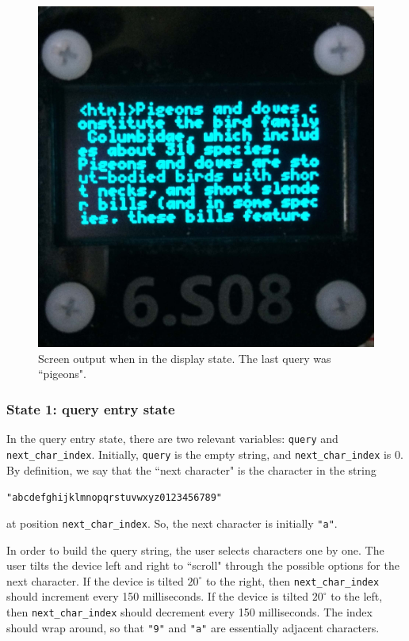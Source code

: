 \documentclass[12pt]{article}
\begin{document}
\begin{figure}[t]
\centering
\includegraphics[scale=0.125]{pigeons.png}
\vspace{5mm}
\caption{Screen output when in the display state. The last query was ``pigeons".}
\label{fig:pigeons}
\end{figure}

\subsubsection{State 1: query entry state}
In the query entry state, there are two relevant variables: \texttt{query} and \texttt{next_char_index}.  Initially, \texttt{query} is the empty string, and \texttt{next_char_index} is 0.  By definition, we say that the ``next character" is the character in the string

\begin{centering}
\texttt{"abcdefghijklmnopqrstuvwxyz0123456789"}\\
\end{centering}
\noindent at position \texttt{next_char_index}.  So, the next character is initially \texttt{"a"}.

In order to build the query string, the user selects characters one by one.  The user tilts the device left and right to ``scroll" through the possible options for the next character.  If the device is tilted $20^{\circ}$ to the right, then \texttt{next_char_index} should increment every 150 milliseconds.  If the device is tilted $20^{\circ}$ to the left, then \texttt{next_char_index} should decrement every 150 milliseconds.  The index should wrap around, so that \texttt{"9"} and \texttt{"a"} are essentially adjacent characters.
\end{document}
